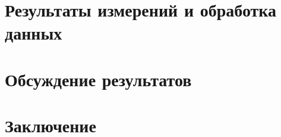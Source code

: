 \documentclass[1 pt]{article}
\begin{document}
\section{Результаты измерений и обработка данных}

\section{Обсуждение результатов}
\section{Заключение}
\end{document}
